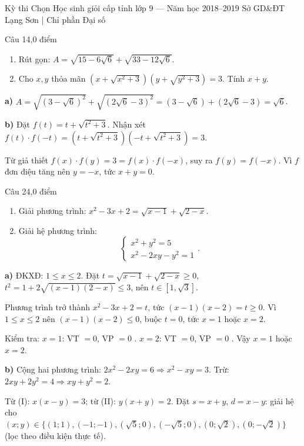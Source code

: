 ﻿%
%
  {Kỳ thi Chọn Học sinh giỏi cấp tỉnh lớp 9 — Năm học 2018--2019}%
  {Sở GD\&ĐT Lạng Sơn | Chỉ phần Đại số}

\begin{de_cau}{Câu 1}{4,0 điểm}
\begin{enumerate}[label=\alph*)]
  \item Rút gọn: $A = \sqrt{15 - 6\sqrt{6}} + \sqrt{33 - 12\sqrt{6}}$.
  \item Cho $x, y$ thỏa mãn $\left(x + \sqrt{x^2 + 3}\right)\left(y + \sqrt{y^2 + 3}\right) = 3$. Tính $x + y$.
\end{enumerate}
\end{de_cau}

\begin{loi_giai_cau}
\textbf{a)} $A = \sqrt{(3-\sqrt{6})^2} + \sqrt{(2\sqrt{6}-3)^2} = (3 - \sqrt{6}) + (2\sqrt{6} - 3) = \sqrt{6}$.

\textbf{b)} Đặt $f(t) = t + \sqrt{t^2+3}$. Nhận xét $f(t)\cdot f(-t) = (t+\sqrt{t^2+3})(-t+\sqrt{t^2+3}) = 3$.

Từ giả thiết $f(x)\cdot f(y) = 3 = f(x)\cdot f(-x)$, suy ra $f(y)=f(-x)$. Vì $f$ đơn điệu tăng nên $y = -x$, tức $\boxed{x+y=0}$.
\end{loi_giai_cau}

\begin{de_cau}{Câu 2}{4,0 điểm}
\begin{enumerate}[label=\alph*)]
  \item Giải phương trình: $x^2 - 3x + 2 = \sqrt{x - 1} + \sqrt{2 - x}$.
  \item Giải hệ phương trình:
  \[\begin{cases} x^2 + y^2 = 5 \\ x^2 - 2xy - y^2 = 1 \end{cases}.\]
\end{enumerate}
\end{de_cau}

\begin{loi_giai_cau}
\textbf{a)} ĐKXĐ: $1 \le x \le 2$. Đặt $t = \sqrt{x-1} + \sqrt{2-x} \ge 0$, $t^2 = 1 + 2\sqrt{(x-1)(2-x)} \le 3$, nên $t \in [1,\sqrt{3}]$.

Phương trình trở thành $x^2-3x+2 = t$, tức $(x-1)(x-2)=t\ge0$. Vì $1\le x\le2$ nên $(x-1)(x-2)\le0$, buộc $t=0$, tức $x=1$ hoặc $x=2$.

Kiểm tra: $x=1$: VT $=0$, VP $=0$ \checkmark . $x=2$: VT $=0$, VP $=0$ \checkmark . Vậy $\boxed{x=1}$ hoặc $\boxed{x=2}$.

\textbf{b)} Cộng hai phương trình: $2x^2 - 2xy = 6 \Rightarrow x^2 - xy = 3$. Trừ: $2xy + 2y^2 = 4 \Rightarrow xy + y^2 = 2$.

Từ (I): $x(x-y)=3$; từ (II): $y(x+y)=2$. Đặt $s=x+y$, $d=x-y$: giải hệ cho $\boxed{(x;y) \in \{(1;1),(-1;-1),(\sqrt{5};0),(- \sqrt{5};0),(0;\sqrt{2}),(0;-\sqrt{2})\}}$ (lọc theo điều kiện thực tế).
\end{loi_giai_cau}

